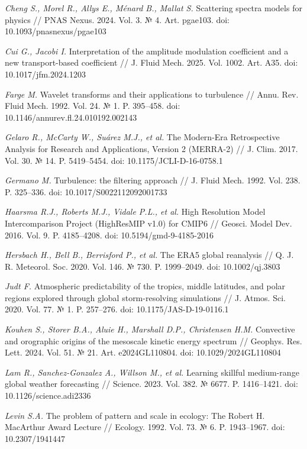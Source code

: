 \documentclass[12pt,a4paper]{article}
\begin{document}
\noindent \textit{Cheng S., Morel R., Allys E., Ménard B., Mallat S.} Scattering spectra models for physics // PNAS Nexus. 2024. Vol. 3. № 4. Art. pgae103. doi: 10.1093/pnasnexus/pgae103

\noindent \textit{Cui G., Jacobi I.} Interpretation of the amplitude modulation coefficient and a new transport-based coefficient // J. Fluid Mech. 2025. Vol. 1002. Art. A35. doi: 10.1017/jfm.2024.1203

\noindent \textit{Farge M.} Wavelet transforms and their applications to turbulence // Annu. Rev. Fluid Mech. 1992. Vol. 24. № 1. P. 395–458. doi: 10.1146/annurev.fl.24.010192.002143

\noindent \textit{Gelaro R., McCarty W., Suárez M.J., et al.} The Modern-Era Retrospective Analysis for Research and Applications, Version 2 (MERRA-2) // J. Clim. 2017. Vol. 30. № 14. P. 5419–5454. doi: 10.1175/JCLI-D-16-0758.1

\noindent \textit{Germano M.} Turbulence: the filtering approach // J. Fluid Mech. 1992. Vol. 238. P. 325–336. doi: 10.1017/S0022112092001733

\noindent \textit{Haarsma R.J., Roberts M.J., Vidale P.L., et al.} High Resolution Model Intercomparison Project (HighResMIP v1.0) for CMIP6 // Geosci. Model Dev. 2016. Vol. 9. P. 4185–4208. doi: 10.5194/gmd-9-4185-2016

\noindent \textit{Hersbach H., Bell B., Berrisford P., et al.} The ERA5 global reanalysis // Q. J. R. Meteorol. Soc. 2020. Vol. 146. № 730. P. 1999–2049. doi: 10.1002/qj.3803

\noindent \textit{Judt F.} Atmospheric predictability of the tropics, middle latitudes, and polar regions explored through global storm-resolving simulations // J. Atmos. Sci. 2020. Vol. 77. № 1. P. 257–276. doi: 10.1175/JAS-D-19-0116.1

\noindent \textit{Kouhen S., Storer B.A., Aluie H., Marshall D.P., Christensen H.M.} Convective and orographic origins of the mesoscale kinetic energy spectrum // Geophys. Res. Lett. 2024. Vol. 51. № 21. Art. e2024GL110804. doi: 10.1029/2024GL110804

\noindent \textit{Lam R., Sanchez-Gonzalez A., Willson M., et al.} Learning skillful medium-range global weather forecasting // Science. 2023. Vol. 382. № 6677. P. 1416–1421. doi: 10.1126/science.adi2336

\noindent \textit{Levin S.A.} The problem of pattern and scale in ecology: The Robert H. MacArthur Award Lecture // Ecology. 1992. Vol. 73. № 6. P. 1943–1967. doi: 10.2307/1941447
\end{document}
